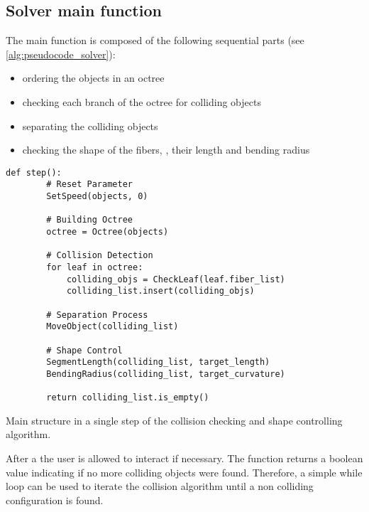 \subsection{Solver main function}
%
The main function is composed of the following sequential parts (see \cref{alg:pseudocode_solver}):
%
\begin{itemize}
    \item ordering the objects in an octree
    \item checking each branch of the octree for colliding objects
    \item separating the colliding objects
    \item checking the shape of the fibers, \ie{}, their length and bending radius
\end{itemize}
%
\begin{lstfloat}[!tb]
    \lstset{style=python}
    \begin{lstlisting}[]
    def step():
        # Reset Parameter
        SetSpeed(objects, 0)
        
        # Building Octree
        octree = Octree(objects)
        
        # Collision Detection
        for leaf in octree:
            colliding_objs = CheckLeaf(leaf.fiber_list)
            colliding_list.insert(colliding_objs)
        
        # Separation Process
        MoveObject(colliding_list)
        
        # Shape Control
        SegmentLength(colliding_list, target_length)
        BendingRadius(colliding_list, target_curvature)
        
        return colliding_list.is_empty()
    \end{lstlisting}
    \caption[]{Main structure in a single step of the collision checking and shape controlling algorithm.}
    \label{alg:pseudocode_solver}
\end{lstfloat}
%
After a  the user is allowed to interact if necessary.
The function returns a boolean value indicating if no more colliding objects were found.
Therefore, a simple while loop can be used to iterate the collision algorithm until a non colliding configuration is found.
%
%
%
